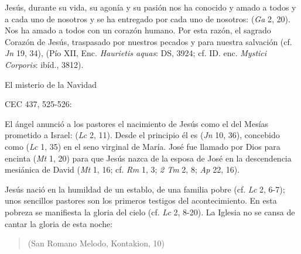 	 Jesús, durante su vida, su agonía y su pasión nos ha conocido y amado a todos y a cada uno de nosotros y se ha entregado por cada uno de nosotros:  (\emph{Ga} 2, 20). Nos ha amado a todos con un corazón humano. Por esta razón, el sagrado Corazón de Jesús, traspasado por nuestros pecados y para nuestra salvación (cf. \emph{Jn} 19, 34),  (Pío XII, Enc. \emph{Haurietis aquas}: DS, 3924; cf. ID. enc. \emph{Mystici Corporis}: ibíd., 3812).
	
	El misterio de la Navidad
	
	CEC 437, 525-526:
	
	 El ángel anunció a los pastores el nacimiento de Jesús como el del Mesías prometido a Israel:  (\emph{Lc} 2, 11). Desde el principio él es  (\emph{Jn} 10, 36), concebido como  (\emph{Lc} 1, 35) en el seno virginal de María. José fue llamado por Dios para  encinta  (\emph{Mt} 1, 20) para que Jesús  nazca de la esposa de José en la descendencia mesiánica de David (\emph{Mt} 1, 16; cf. \emph{Rm} 1, 3; \emph{2 Tm} 2, 8; \emph{Ap} 22, 16).
	
	 Jesús nació en la humildad de un establo, de una familia pobre (cf. \emph{Lc} 2, 6-7); unos sencillos pastores son los primeros testigos del acontecimiento. En esta pobreza se manifiesta la gloria del cielo (cf. \emph{Lc} 2, 8-20). La Iglesia no se cansa de cantar la gloria de esta noche:
	
	\begin{quote}
		
		(San Romano Melodo, Kontakion, 10)
	\end{quote}
	

